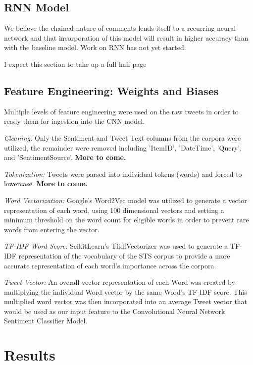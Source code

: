 \documentclass[11pt]{article}
\begin{document}
\subsection{RNN Model}

We believe the chained nature of comments lends itself to a recurring neural network
and that incorporation of this model will result in higher accuracy than with the baseline
model. Work on RNN has not yet started.

I expect this section to take up a full half page

\subsection{Feature Engineering: Weights and Biases}

Multiple levels of feature engineering were used on the raw tweets in order to 
ready them for ingestion into the CNN model.

\textit{Cleaning:} Only the Sentiment and Tweet Text columns from the corpora 
were utilized, the remainder were removed including 'ItemID', 'DateTime', 'Query', 
and 'SentimentSource'. \textbf{More to come.}

\textit{Tokenization:} Tweets were parsed into individual tokens (words) and 
forced to lowercase. \textbf{More to come.}

\textit{Word Vectorization:} Google's Word2Vec model was utilized 
to generate a vector representation of each word, using 100 dimensional 
vectors and setting a minimum threshold on the word count for eligible 
words in order to prevent rare words from entering the vector. 

\textit{TF-IDF Word Score:} ScikitLearn's TfidfVectorizer was used to
generate a TF-IDF representation of the vocabulary of the STS corpus to provide a more accurate 
representation of each word's importance across the corpora. 

\textit{Tweet Vector:} An overall vector representation of each Word was created by
multiplying the individual Word vector by the same Word's TF-IDF score. This 
multiplied word vector was then incorporated into an average Tweet vector that would 
be used as our input feature to the Convolutional Neural Network Sentiment Classifier Model. 



\section{Results}
\end{document}
